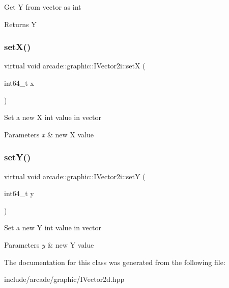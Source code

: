 Get Y from vector as int \begin{DoxyReturn}{Returns}
Y 
\end{DoxyReturn}
\mbox{\label{classarcade_1_1graphic_1_1_i_vector2i_a3ef07e88c3402db1483253080ca4c4cb}} 
\subsubsection{\texorpdfstring{setX()}{setX()}}
{\footnotesize\ttfamily virtual void arcade\+::graphic\+::\+I\+Vector2i\+::setX (\begin{DoxyParamCaption}\item[{int64\+\_\+t}]{x }\end{DoxyParamCaption})\hspace{0.3cm}{\ttfamily [pure virtual]}}

Set a new X int value in vector 
\begin{DoxyParams}{Parameters}
{\em x} & new X value \\
\hline
\end{DoxyParams}
\mbox{\label{classarcade_1_1graphic_1_1_i_vector2i_a7102b9873dc2860392035b329ef84a0f}} 
\subsubsection{\texorpdfstring{setY()}{setY()}}
{\footnotesize\ttfamily virtual void arcade\+::graphic\+::\+I\+Vector2i\+::setY (\begin{DoxyParamCaption}\item[{int64\+\_\+t}]{y }\end{DoxyParamCaption})\hspace{0.3cm}{\ttfamily [pure virtual]}}

Set a new Y int value in vector 
\begin{DoxyParams}{Parameters}
{\em y} & new Y value \\
\hline
\end{DoxyParams}


The documentation for this class was generated from the following file\+:\begin{DoxyCompactItemize}
\item 
include/arcade/graphic/I\+Vector2d.\+hpp\end{DoxyCompactItemize}
